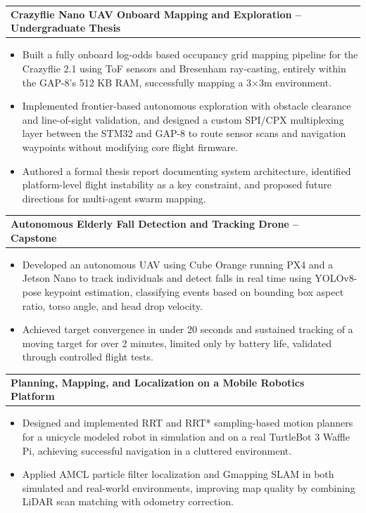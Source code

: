 \documentclass[letterpaper,11pt]{article}
\makeatletter
\newcommand{\resumeItem}[1]{
  \item\small{
    {#1 \vspace{-2.5pt}}
  }
}
\newcommand{\resumeProjectHeading}[2]{
    \item
    \begin{tabular*}{0.97\textwidth}{l@{\extracolsep{\fill}}r}
      \small#1 & #2 \\
    \end{tabular*}\vspace{-7pt}
}
\newcommand{\resumeItemListStart}{\begin{itemize}}
\newcommand{\resumeItemListEnd}{\end{itemize}\vspace{-5pt}}
\newcommand\z{-2.4pt}
\makeatother
\begin{document}
\resumeProjectHeading
      {\textbf{Crazyflie Nano UAV Onboard Mapping and Exploration -- Undergraduate Thesis}}{ }
      \resumeItemListStart
    \resumeItem{Built a fully onboard log-odds based occupancy grid mapping pipeline for the Crazyflie 2.1 using ToF sensors and 
    Bresenham ray-casting, entirely within the GAP-8's 512 KB 
    RAM, successfully mapping a 3×3m environment.}
        \resumeItem{Implemented frontier-based autonomous exploration with obstacle clearance and line-of-sight validation, and designed a custom SPI/CPX multiplexing layer between the STM32 and GAP-8 to route sensor scans and navigation waypoints without modifying core flight firmware.}
		  \resumeItem{Authored a formal thesis report documenting system architecture, identified platform-level 
    flight instability as a key constraint, and proposed future directions for multi-agent swarm mapping.}
\resumeItemListEnd
\vspace{\z}

\resumeProjectHeading
      {\textbf{Autonomous Elderly Fall Detection and Tracking Drone -- Capstone}}{ }
      \resumeItemListStart
       \resumeItem{Developed an autonomous UAV using Cube Orange running PX4 and a Jetson Nano to track individuals and detect falls in real time using YOLOv8-pose keypoint estimation, classifying events based on bounding box aspect ratio, torso angle, and head drop velocity.}
        \resumeItem{Achieved target convergence in under 20 seconds and sustained tracking of a moving target for over 2 minutes, limited only by battery life, validated through controlled flight tests.}
      \resumeItemListEnd
\vspace{\z}

\resumeProjectHeading{\textbf{Planning, Mapping, and Localization on a Mobile Robotics Platform }}{ }
\resumeItemListStart
	\resumeItem{Designed and implemented RRT and RRT* sampling-based motion planners for a unicycle modeled robot in simulation and on a real TurtleBot 3 Waffle Pi, achieving successful navigation in a cluttered environment.}
	\resumeItem{Applied AMCL particle filter localization and Gmapping SLAM in both simulated and real-world environments, improving map quality by combining LiDAR scan matching with odometry correction.}
\resumeItemListEnd


\end{document}
